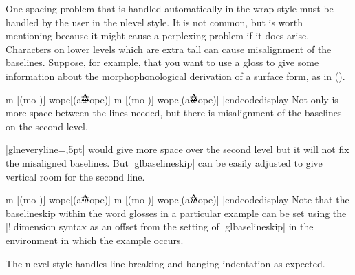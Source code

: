 One spacing problem that is handled automatically in the wrap style
must be handled by the user in the nlevel style.  It is not common,
but is worth mentioning because it might cause a perplexing problem if
it does arise.  Characters on lower levels which are extra tall can
cause misalignment of the baselines.  Suppose, for example, that you
want to use a gloss to give some information about the
morphophonological derivation of a surface form, as in (\nextx).

\def\AccentedBarredW{$\acute{\hbox{$\overline w$}}$}

\framedisplay
\ex[glstyle=nlevel,glneveryline={\it}]
\begingl m-[(mo-)] wope[(a\AccentedBarredW ope)] \endgl \xe
\endframedisplay
\codedisplay
\ex[glstyle=nlevel,glneveryline={\it}]
\begingl m-[(mo-)] wope[(a\AccentedBarredW ope)] \endgl \xe
|endcodedisplay
Not only is more space between the lines needed, but there is
misalignment of the baselines on the second level.

|glneveryline={,5pt}| would give more space over the second level but
it will not fix the misaligned baselines. But |glbaselineskip| can be
easily adjusted to give vertical room for the second line.

\framedisplay
\ex[glstyle=nlevel,glbaselineskip=!6pt]
\begingl m-[(mo-)] wope[(a\AccentedBarredW ope)] \endgl \xe
\endframedisplay
\codedisplay
\ex[glstyle=nlevel,glbaselineskip=!6pt]
\begingl m-[(mo-)] wope[(a\AccentedBarredW ope)] \endgl
\xe
|endcodedisplay
Note that the baselineskip within the word glosses in a particular
example can be set using the |!|dimension syntax as an offset from the
setting of |glbaselineskip| in the environment in which the example
occurs.

The nlevel style handles line breaking and hanging indentation as
expected.

